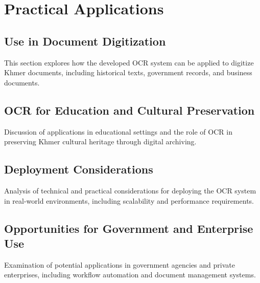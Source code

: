 \chapter{Practical Applications}
\label{ch:applications}

\section{Use in Document Digitization}
\label{sec:digitization}
This section explores how the developed OCR system can be applied to digitize Khmer documents, including historical texts, government records, and business documents.

\section{OCR for Education and Cultural Preservation}
\label{sec:preservation}
Discussion of applications in educational settings and the role of OCR in preserving Khmer cultural heritage through digital archiving.

\section{Deployment Considerations}
\label{sec:deployment}
Analysis of technical and practical considerations for deploying the OCR system in real-world environments, including scalability and performance requirements.

\section{Opportunities for Government and Enterprise Use}
\label{sec:opportunities}
Examination of potential applications in government agencies and private enterprises, including workflow automation and document management systems.
